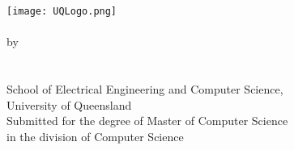\begin{titlepage}
	\begin{center}
		\texttt{[image: UQLogo.png]}\\
        \vfill
		\huge\textbf{\covertext}\\
        \vfill
		\large by\\
		\vspace{5mm}
		\Large\textbf{\authortext}\\
        \large \studentnotext \\
        \large {}
        \vfill
		\large School of Electrical Engineering and Computer Science,\\\smallskip
        \large University of Queensland\\
        \vfill
		\large Submitted for the degree of Master of Computer Science\\\smallskip
        \large in the division of Computer Science
        \vfill
		\large \thesisduedate
	\end{center}
\end{titlepage}